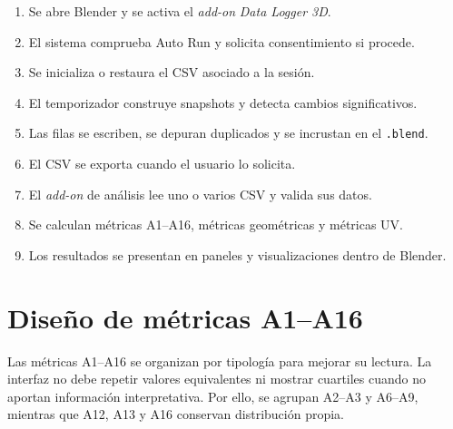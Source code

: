 \begin{enumerate}
    \item Se abre Blender y se activa el \textit{add-on} \textit{Data Logger 3D}.
    \item El sistema comprueba Auto Run y solicita consentimiento si procede.
    \item Se inicializa o restaura el CSV asociado a la sesión.
    \item El temporizador construye snapshots y detecta cambios significativos.
    \item Las filas se escriben, se depuran duplicados y se incrustan en el \texttt{.blend}.
    \item El CSV se exporta cuando el usuario lo solicita.
    \item El \textit{add-on} de análisis lee uno o varios CSV y valida sus datos.
    \item Se calculan métricas A1--A16, métricas geométricas y métricas UV.
    \item Los resultados se presentan en paneles y visualizaciones dentro de Blender.
\end{enumerate}

\section{Diseño de métricas A1--A16}
\label{sec:c-diseno-a1-A16}

Las métricas A1--A16 se organizan por tipología para mejorar su lectura. La interfaz no debe repetir valores equivalentes ni mostrar cuartiles cuando no aportan información interpretativa. Por ello, se agrupan A2--A3 y A6--A9, mientras que A12, A13 y A16 conservan distribución propia.

